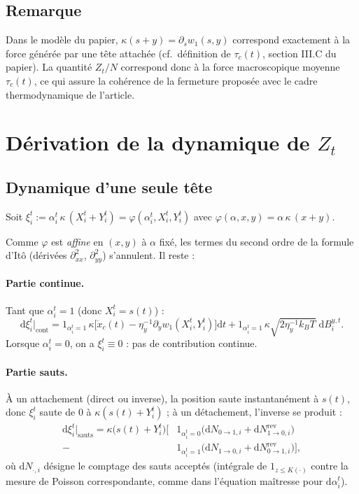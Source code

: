 \documentclass[11pt,a4paper]{article}
\newcommand{\dd}{\mathrm{d}}
\newcommand{\indic}[1]{\mathrm{1}_{#1}}
\begin{document}
\subsection*{Remarque}

Dans le modèle du papier, $\kappa(s+y) = \partial_s w_1(s,y)$
correspond exactement à la force générée par une tête attachée
(cf.\ définition de $\tau_c(t)$, section III.C du papier). La quantité
$Z_t/N$ correspond donc à la force macroscopique moyenne
$\tau_c(t)$, ce qui assure la cohérence de la fermeture proposée
avec le cadre thermodynamique de l'article.

\section{Dérivation de la dynamique de $Z_t$}

\subsection{Dynamique d'une seule tête}

Soit $\xi_i^t := \alpha_i^t\,\kappa\,(X_i^t+Y_i^t) = \varphi(\alpha_i^t, X_i^t, Y_i^t)$
avec $\varphi(\alpha,x,y) = \alpha\,\kappa\,(x+y)$.

Comme $\varphi$ est \emph{affine} en $(x,y)$ à $\alpha$ fixé, les
termes du second ordre de la formule d'Itô (dérivées
$\partial^2_{xx}$, $\partial^2_{yy}$) s'annulent. Il reste :

\paragraph{Partie continue.} Tant que $\alpha_i^t=1$ (donc
$X_i^t=s(t)$) :
\[
\dd\xi_i^t\Big|_{\text{cont}}
= \indic{\alpha_i^t=1}\,\kappa\Big[\dot x_c(t)
- \eta_y^{-1}\partial_y w_1(X_i^t,Y_i^t)\Big]\dd t
+ \indic{\alpha_i^t=1}\,\kappa\sqrt{2\eta_y^{-1}k_BT}\;\dd B_i^{y,t}.
\]
Lorsque $\alpha_i^t=0$, on a $\xi_i^t \equiv 0$ : pas de contribution
continue.

\paragraph{Partie sauts.} À un attachement (direct ou inverse), la
position saute instantanément à $s(t)$, donc $\xi_i^t$ saute de $0$ à
$\kappa(s(t)+Y_i^t)$ ; à un détachement, l'inverse se produit :
\begin{align*}
\dd\xi_i^t\Big|_{\text{sauts}}
= \kappa\big(s(t)+Y_i^t\big)\Big[
&\indic{\alpha_i^t=0}\big(\dd N_{0\to1,i} + \dd N^{\mathrm{rev}}_{1\to0,i}\big) \\
- &\indic{\alpha_i^t=1}\big(\dd N_{1\to0,i} + \dd N^{\mathrm{rev}}_{0\to1,i}\big)
\Big],
\end{align*}
où $\dd N_{\cdot,i}$ désigne le comptage des sauts acceptés (intégrale
de $\indic{z\le K(\cdot)}$ contre la mesure de Poisson correspondante,
comme dans l'équation maîtresse pour $\dd\alpha_i^t$).
\end{document}
